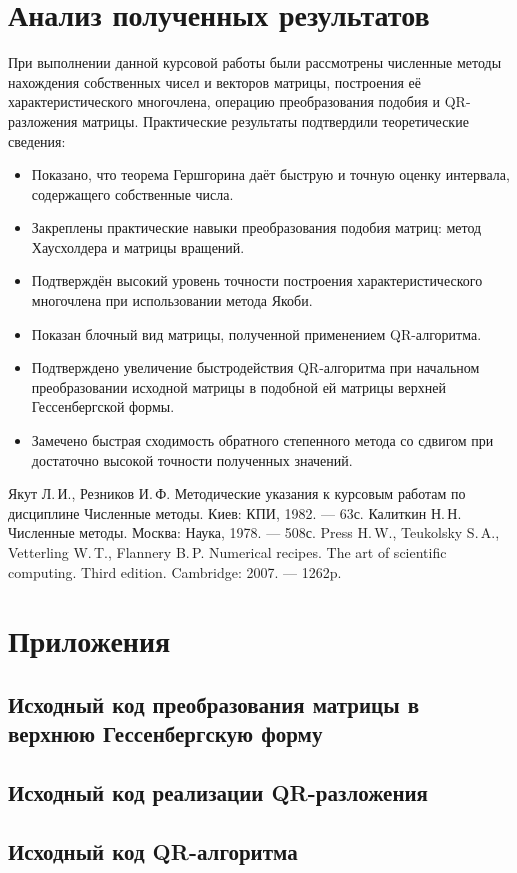 \documentclass[a4paper,12pt,notitlepage,pdftex,headsepline]{scrartcl}
\begin{document}
\section{Анализ полученных результатов}
При выполнении данной курсовой работы были рассмотрены численные методы нахождения собственных чисел и векторов матрицы, построения её характеристического многочлена, операцию преобразования подобия и QR-разложения матрицы.
Практические результаты подтвердили теоретические сведения:
\begin{itemize}
\item Показано, что теорема Гершгорина даёт быструю и точную оценку интервала, содержащего собственные числа.
\item Закреплены практические навыки преобразования подобия матриц: метод Хаусхолдера и матрицы вращений.
\item Подтверждён высокий уровень точности построения характеристического многочлена при использовании метода Якоби.
\item Показан блочный вид матрицы, полученной применением QR-алгоритма.
\item Подтверждено увеличение быстродействия QR-алгоритма при начальном преобразовании исходной матрицы в подобной ей матрицы верхней Гессенбергской формы.
\item Замечено быстрая сходимость обратного степенного метода со сдвигом при достаточно высокой точности полученных значений.
\end{itemize}
\newpage
{}
\begin{thebibliography}{0}
Якут Л.\,И., Резников И.\,Ф. Методические указания к курсовым работам по дисциплине Численные методы. Киев: КПИ, 1982. --- 63с.
Калиткин Н.\,Н. Численные методы. Москва: Наука, 1978. --- 508с.
Press H.\,W., Teukolsky S.\,A., Vetterling W.\,T., Flannery B.\,P. Numerical recipes. The art of scientific computing. Third edition. Cambridge: 2007. --- 1262p.
\end{thebibliography}
\newpage
\section*{Приложения}
\subsection*{Исходный код преобразования матрицы в верхнюю Гессенбергскую форму}
\subsection*{Исходный код реализации QR-разложения}
\subsection*{Исходный код QR-алгоритма}
\end{document}
